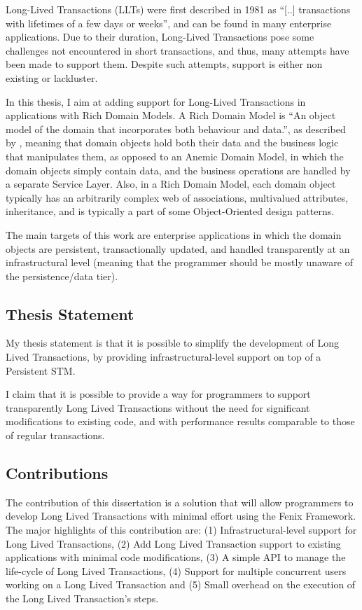 \documentclass{llncs}
\begin{document}
Long-Lived Transactions (LLTs) were first described in 1981 as ``[..]
transactions with lifetimes of a few days or
weeks''\cite{gray1981transaction}, and can be found in many enterprise
applications. Due to their duration, Long-Lived Transactions pose some
challenges not encountered in short transactions, and thus, many
attempts have been made to support them. Despite such attempts,
support is either non existing or lackluster.

In this thesis, I aim at adding support for Long-Lived Transactions in
applications with Rich Domain Models.  A Rich Domain Model is ``An
object model of the domain that incorporates both behaviour and
data.'', as described by \cite{fowler2003patterns}, meaning that
domain objects hold both their data and the business logic that
manipulates them, as opposed to an Anemic Domain Model, in which the
domain objects simply contain data, and the business operations are
handled by a separate Service Layer. Also, in a Rich Domain Model,
each domain object typically has an arbitrarily complex web of
associations, multivalued attributes, inheritance, and is typically a
part of some Object-Oriented design patterns.

The main targets of this work are enterprise applications in which the
domain objects are persistent, transactionally updated, and handled
transparently at an infrastructural level (meaning that the programmer
should be mostly unaware of the persistence/data tier).

\subsection{Thesis Statement}

My thesis statement is that it is possible to simplify the development
of Long Lived Transactions, by providing infrastructural-level support
on top of a Persistent STM.

I claim that it is possible to provide a way for programmers to
support transparently Long Lived Transactions without the need for
significant modifications to existing code, and with performance
results comparable to those of regular transactions.

\subsection{Contributions}

The contribution of this dissertation is a solution that will allow
programmers to develop Long Lived Transactions with minimal effort
using the Fenix Framework. The major highlights of this contribution
are: (1) Infrastructural-level support for Long Lived Transactions,
(2) Add Long Lived Transaction support to existing applications with
minimal code modifications, (3) A simple API to manage the life-cycle
of Long Lived Transactions, (4) Support for multiple concurrent users
working on a Long Lived Transaction and (5) Small overhead on the
execution of the Long Lived Transaction's steps.
\end{document}
